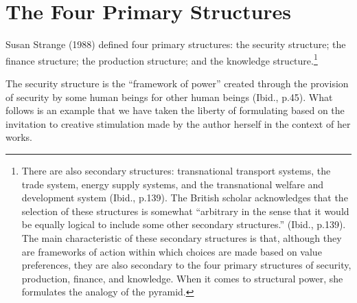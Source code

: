\section{The Four Primary Structures}

Susan Strange (1988) defined four primary structures: the security structure; the finance structure; the production structure; and the knowledge structure.\footnote{There are also secondary structures: transnational transport systems, the trade system, energy supply systems, and the transnational welfare and development system (Ibid., p.139). The British scholar acknowledges that the selection of these structures is somewhat ``arbitrary in the sense that it would be equally logical to include some other secondary structures.'' (Ibid., p.139). The main characteristic of these secondary structures is that, although they are frameworks of action within which choices are made based on value preferences, they are also secondary to the four primary structures of security, production, finance, and knowledge. When it comes to structural power, she formulates the analogy of the pyramid.}

The security structure is the ``framework of power'' created through the provision of security by some human beings for other human beings (Ibid., p.45). What follows is an example that we have taken the liberty of formulating based on the invitation to creative stimulation made by the author herself in the context of her works.

